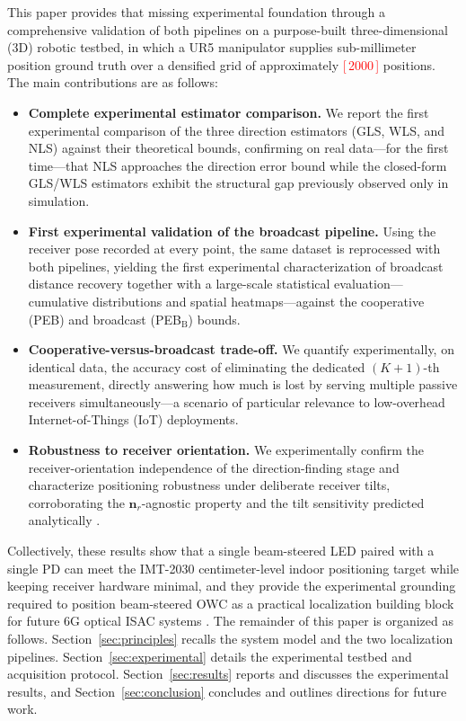 \documentclass[journal]{IEEEtran}
\newcommand{\ph}[1]{\textcolor{red}{[\,#1\,]}}
\begin{document}
This paper provides that missing experimental foundation through a comprehensive validation of both pipelines on a purpose-built three-dimensional (3D) robotic testbed, in which a UR5 manipulator supplies sub-millimeter position ground truth over a densified grid of approximately \ph{2000} positions. The main contributions are as follows:
\begin{itemize}
    \item \textbf{Complete experimental estimator comparison.} We report the first experimental comparison of the three direction estimators (GLS, WLS, and NLS) against their theoretical bounds, confirming on real data---for the first time---that NLS approaches the direction error bound while the closed-form GLS/WLS estimators exhibit the structural gap previously observed only in simulation.
    \item \textbf{First experimental validation of the broadcast pipeline.} Using the receiver pose recorded at every point, the same dataset is reprocessed with both pipelines, yielding the first experimental characterization of broadcast distance recovery together with a large-scale statistical evaluation---cumulative distributions and spatial heatmaps---against the cooperative (PEB) and broadcast (PEB$_\mathrm{B}$) bounds.
    \item \textbf{Cooperative-versus-broadcast trade-off.} We quantify experimentally, on identical data, the accuracy cost of eliminating the dedicated $(K{+}1)$-th measurement, directly answering how much is lost by serving multiple passive receivers simultaneously---a scenario of particular relevance to low-overhead Internet-of-Things (IoT) deployments.
    \item \textbf{Robustness to receiver orientation.} We experimentally confirm the receiver-orientation independence of the direction-finding stage and characterize positioning robustness under deliberate receiver tilts, corroborating the $\mathbf{n}_r$-agnostic property and the tilt sensitivity predicted analytically \cite{acuna2026robust}.
\end{itemize}

Collectively, these results show that a single beam-steered LED paired with a single PD can meet the IMT-2030 centimeter-level indoor positioning target while keeping receiver hardware minimal, and they provide the experimental grounding required to position beam-steered OWC as a practical localization building block for future 6G optical ISAC systems \cite{Trevlakis2023, LiuF2022ISAC}. The remainder of this paper is organized as follows. Section~\ref{sec:principles} recalls the system model and the two localization pipelines. Section~\ref{sec:experimental} details the experimental testbed and acquisition protocol. Section~\ref{sec:results} reports and discusses the experimental results, and Section~\ref{sec:conclusion} concludes and outlines directions for future work.
\end{document}
